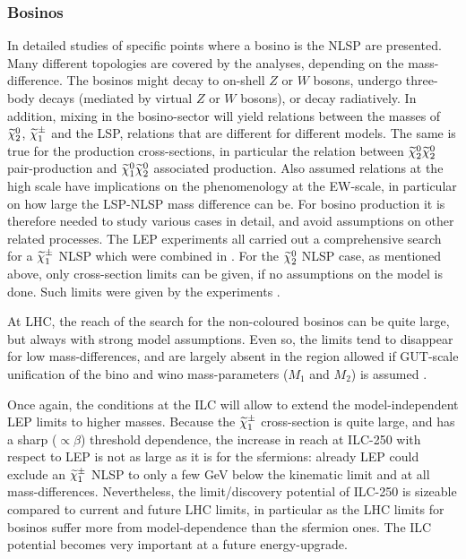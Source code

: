 \subsubsection{Bosinos}
\label{subsec:searches_bosinos}

In \cite{Berggren:2015qua,Berggren:2013vfa,Baer:2016new,Chera:402736}
detailed studies of specific points where a bosino is the NLSP
are presented.
Many different topologies are covered by the analyses,
depending on the mass-difference.
The bosinos might decay to on-shell $Z$ or $W$ bosons,
undergo three-body decays (mediated by virtual
$Z$ or $W$ bosons), or decay radiatively.
In addition,
mixing in the bosino-sector will yield relations between the masses
of $\mbox{$ \widetilde{\chi}^0_2 $}$, $\mbox{$ \widetilde{\chi}^{\pm}_1 $}$ and the LSP, relations that are different
for different models.
The same is true for the production cross-sections,
in particular the relation between $\mbox{$ \widetilde{\chi}^0_2 $}\mbox{$ \widetilde{\chi}^0_2 $}$
pair-production and
$\mbox{$ \widetilde{\chi}^0_1 $}\mbox{$ \widetilde{\chi}^0_2 $}$ associated production.
Also assumed relations at the high scale have implications on
the phenomenology at the EW-scale,
in particular on how large the LSP-NLSP mass difference can be.
For bosino production it is therefore needed to study
various cases in detail,
and avoid assumptions on other related processes.
The LEP experiments all carried out a comprehensive
search for a $\mbox{$ \widetilde{\chi}^{\pm}_1 $}$ NLSP which were combined in \cite{LEPSUSYWG/02-04.1}.
For the   $\mbox{$ \widetilde{\chi}^0_2 $}$ NLSP case,
as mentioned above,
only cross-section limits can be given,
if no assumptions on the model is done.
Such limits were given by the experiments \cite{Abdallah:2003xe,Acciarri:1999km,Abbiendi:2003sc}.

At LHC, the reach of the search for the non-coloured bosinos
can be quite large, but always with strong model assumptions.
Even so, the limits tend to disappear for low mass-differences,
and are largely absent in the region allowed if GUT-scale unification
of the bino and wino mass-parameters ($M_1$ and $M_2$) is assumed
\cite{Aaboud:2018jiw,Aaboud:2017leg,Sirunyan:2018ubx}.

Once again, the conditions at the ILC will allow to extend the
model-independent LEP limits to higher masses.
Because the $\mbox{$ \widetilde{\chi}^{\pm}_1 $}$ cross-section is quite large, and has
a sharp ($\propto \beta$) threshold dependence,
the increase in reach at ILC-250 with respect to LEP is
not as large as it is for the sfermions: already LEP could
exclude  an $\mbox{$ \widetilde{\chi}^{\pm}_1 $}$ NLSP to only a few GeV below the kinematic limit
and at all mass-differences.
Nevertheless,
the limit/discovery potential of ILC-250 is sizeable
compared to current and future LHC limits,
in particular as the LHC limits for bosinos suffer
more from model-dependence than the sfermion ones.
The ILC potential
becomes very important at a future energy-upgrade. 

